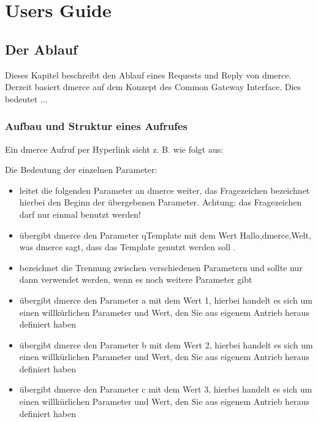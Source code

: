 \part{Users Guide}

\chapter{Der Ablauf}

Dieses Kapitel beschreibt den Ablauf eines Requests und Reply von
dmerce. Derzeit basiert dmerce auf dem Konzept des Common Gateway
Interface. Dies bedeutet ...

\newpage
\section{Aufbau und Struktur eines Aufrufes}

Ein dmerce Aufruf per Hyperlink sieht z. B. wie folgt aus:


Die Bedeutung der einzelnen Parameter:

\begin{itemize}
\item {} leitet die folgenden Parameter an
  dmerce weiter, das Fragezeichen bezeichnet hierbei den Beginn der
  \"ubergebenen Parameter. Achtung: das Fragezeichen darf nur einmal
  benutzt werden!
\item {} \"ubergibt dmerce den
  Parameter qTemplate mit dem Wert Hallo,dmerce,Welt, was dmerce sagt,
  dass das Template 
  genutzt werden soll .
\item \wancicode{\&} bezeichnet die Trennung zwischen verschiedenen
  Parametern und sollte nur dann verwendet werden, wenn es noch
  weitere Parameter gibt
\item {} \"ubergibt dmerce den Parameter a mit dem Wert
  1, hierbei handelt es sich um einen willk\"urlichen Parameter und
  Wert, den Sie aus eigenem Antrieb heraus definiert haben
\item {} \"ubergibt dmerce den Parameter b mit dem Wert
  2, hierbei handelt es sich um einen willk\"urlichen Parameter und
  Wert, den Sie aus eigenem Antrieb heraus definiert haben
\item {} \"ubergibt dmerce den Parameter c mit dem Wert
  3, hierbei handelt es sich um einen willk\"urlichen Parameter und
  Wert, den Sie aus eigenem Antrieb heraus definiert haben
\end{itemize}

